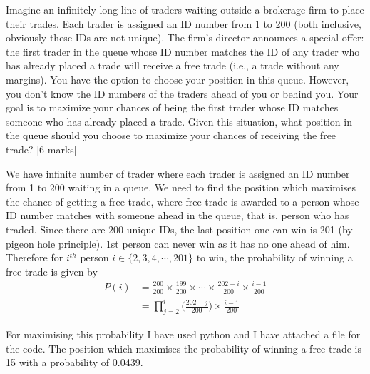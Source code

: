 \begin{que}
	Imagine an infinitely long line of traders waiting outside a brokerage
	firm to place their trades. Each trader is assigned an ID number from 1
	to 200 (both inclusive, obviously these IDs are not unique). The firm’s
	director announces a special offer: the first trader in the queue whose
	ID number matches the ID of any trader who has already placed a trade
	will receive a free trade (i.e., a trade without any margins). You have
	the option to choose your position in this queue.   However, you don’t
	know the ID numbers of the traders ahead of you or behind you. Your
	goal is to maximize your chances of being the first trader whose ID
	matches someone who has already placed a trade. Given this situation,
	what position in the queue should you choose to maximize your chances
	of receiving the free trade?
	\hspace*{\fill} [6 marks]
\end{que}
\begin{tcolorbox}[breakable]
	\begin{sol}
		We have infinite number of trader where each trader is assigned
		an ID number from 1 to 200 waiting in a queue. We need to find
		the position which maximises the chance of getting a free
		trade, where free trade is awarded to a person whose ID number
		matches with someone ahead in the queue, that is, person who
		has traded. Since there are 200 unique IDs, the last position
		one can win is 201 (by pigeon hole principle). 1st person can
		never win as it has no one ahead of him. Therefore for $i^{th}$
		person $i \in \{2,3,4,\cdots,201 \}$ to win, the probability of
		winning a free trade is given by
		\begin{align}
			P(i) & = \frac{200}{200} \times \frac{199}{200} \times \cdots \times \frac{202 - i}{200} \times \frac{i-1}{200} \\
			     & = \prod_{j=2}^{i} \Bigg( \frac{202 - j}{200} \Bigg) \times \frac{i - 1}{200}
		\end{align}

		For maximising this probability I have used python and I have
		attached a file for the code. The position which maximises the
		probability of winning a free trade is 15 with a probability of
		0.0439.

	\end{sol}
\end{tcolorbox}
